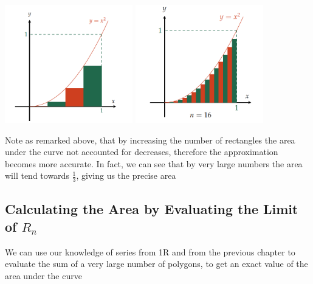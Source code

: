 \documentclass[english,course]{Notes}
\begin{document}
\begin{enumerate}
\includegraphics[width=15em]{area4strips2} \includegraphics[width=15em]{area16strips2}
	
\end{enumerate}

\par{Note as remarked above, that by increasing the number of rectangles the area under the curve not accounted for decreases, therefore the approximation becomes more accurate. In fact, we can see that by very large numbers the area will tend towards $\tfrac{1}{3}$, giving us the precise area}


\newpage
\subsection{Calculating the Area by Evaluating the Limit of $R_n$}

\par{We can use our knowledge of series from 1R and from the previous chapter to evaluate the sum of a very large number of polygons, to get an exact value of the area under the curve}
\end{document}

